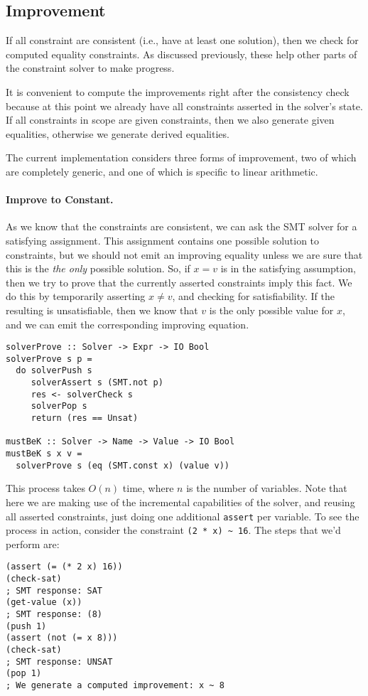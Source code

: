 \documentclass{sigplanconf}
\begin{document}
\subsection{Improvement}

If all constraint are consistent (i.e., have at least one solution),
then we check for computed equality constraints.  As discussed previously,
these help other parts of the constraint solver to make progress.

It is convenient to compute the improvements right after the consistency
check because at this point we already have all constraints asserted
in the solver's state.  If all constraints in scope are given constraints,
then we also generate given equalities, otherwise we generate derived
equalities.

The current implementation considers three forms of improvement,
two of which are completely generic, and one of which is specific to
linear arithmetic.

\paragraph{Improve to Constant.} As we know that the constraints are
consistent, we can ask the SMT solver for a satisfying assignment.
This assignment contains one possible solution to constraints, but
we should not emit an improving equality unless we are sure that
this is the {\em the only} possible solution.  So, if $x = v$ is
in the satisfying assumption, then we try to prove that the currently
asserted constraints imply this fact.  We do this by temporarily asserting
$x \neq v$, and checking for satisfiability.  If the resulting is unsatisfiable,
then we know that $v$ is the only possible value for $x$,
and we can emit the corresponding improving equation.
\begin{Verbatim}
solverProve :: Solver -> Expr -> IO Bool
solverProve s p =
  do solverPush s
     solverAssert s (SMT.not p)
     res <- solverCheck s
     solverPop s
     return (res == Unsat)

mustBeK :: Solver -> Name -> Value -> IO Bool
mustBeK s x v =
  solverProve s (eq (SMT.const x) (value v))
\end{Verbatim}
This process takes $O(n)$ time, where $n$ is the number of variables.
Note that here we are making use of the incremental capabilities of the
solver, and reusing all asserted constraints, just doing one
additional \Verb"assert" per variable. To see the process in action,
consider the constraint \Verb"(2 * x) ~ 16".  The steps that we'd perform
are:
\break
\begin{Verbatim}
(assert (= (* 2 x) 16))
(check-sat)
; SMT response: SAT
(get-value (x))
; SMT response: (8)
(push 1)
(assert (not (= x 8)))
(check-sat)
; SMT response: UNSAT
(pop 1)
; We generate a computed improvement: x ~ 8
\end{Verbatim}
\end{document}

